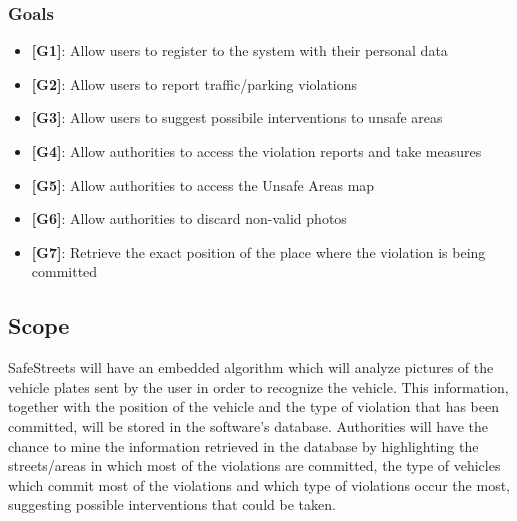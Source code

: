 \documentclass[12pt,a4paper]{article}
\begin{document}
\subsubsection{Goals}
\begin{itemize}
\item {\textbf[}\textbf{G1}{\textbf]}: Allow users to register to the system with their personal data
\item {\textbf[}\textbf{G2}{\textbf]}: Allow users to report traffic/parking violations 
\item {\textbf[}\textbf{G3}{\textbf]}: Allow users to suggest possibile interventions to unsafe areas
\item {\textbf[}\textbf{G4}{\textbf]}: Allow authorities to access the violation reports and take measures 
\item {\textbf[}\textbf{G5}{\textbf]}: Allow authorities to access the Unsafe Areas map
\item {\textbf[}\textbf{G6}{\textbf]}: Allow authorities to discard non-valid photos
\item {\textbf[}\textbf{G7}{\textbf]}: Retrieve the exact position of the place where the violation is being committed
\end{itemize}
\subsection{Scope}
SafeStreets will have an embedded algorithm which will analyze pictures of the vehicle plates sent by the user in order to recognize the vehicle. This information, together with the position of the vehicle and the type of violation that has been committed, will be stored in the software's database.
\newline
Authorities will have the chance to mine the information retrieved in the database by highlighting the streets/areas in which most of the violations are committed, the type of vehicles which commit most of the violations and which type of violations occur the most, suggesting possible interventions that could be taken.	
\end{document}
